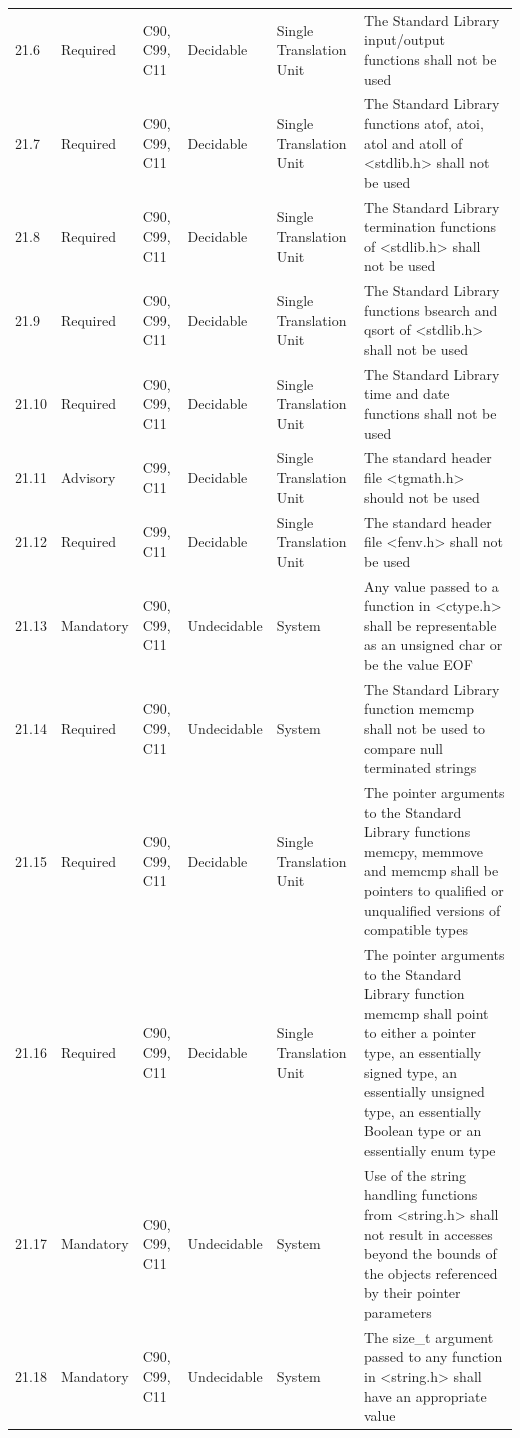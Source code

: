 \documentclass[11pt]{article}
\begin{document}
{\begin{longtable}{@{}p{1.0cm}p{1.6cm}p{1.8cm}p{2.0cm}p{1.6cm}p{7.4cm}@{}}
21.6 & Required & C90, C99, C11 & Decidable & Single Translation Unit & The Standard Library input/output functions shall not be used \\
21.7 & Required & C90, C99, C11 & Decidable & Single Translation Unit & The Standard Library functions atof, atoi, atol and atoll of <stdlib.h> shall not be used \\
21.8 & Required & C90, C99, C11 & Decidable & Single Translation Unit & The Standard Library termination functions of <stdlib.h> shall not be used \\
21.9 & Required & C90, C99, C11 & Decidable & Single Translation Unit & The Standard Library functions bsearch and qsort of <stdlib.h> shall not be used \\
21.10 & Required & C90, C99, C11 & Decidable & Single Translation Unit & The Standard Library time and date functions shall not be used \\
21.11 & Advisory & C99, C11 & Decidable & Single Translation Unit & The standard header file <tgmath.h> should not be used \\
21.12 & Required & C99, C11 & Decidable & Single Translation Unit & The standard header file <fenv.h> shall not be used \\
21.13 & Mandatory & C90, C99, C11 & Undecidable & System & Any value passed to a function in <ctype.h> shall be representable as an unsigned char or be the value EOF \\
21.14 & Required & C90, C99, C11 & Undecidable & System & The Standard Library function memcmp shall not be used to compare null terminated strings \\
21.15 & Required & C90, C99, C11 & Decidable & Single Translation Unit & The pointer arguments to the Standard Library functions memcpy, memmove and memcmp shall be pointers to qualified or unqualified versions of compatible types \\
21.16 & Required & C90, C99, C11 & Decidable & Single Translation Unit & The pointer arguments to the Standard Library function memcmp shall point to either a pointer type, an essentially signed type, an essentially unsigned type, an essentially Boolean type or an essentially enum type \\
21.17 & Mandatory & C90, C99, C11 & Undecidable & System & Use of the string handling functions from <string.h> shall not result in accesses beyond the bounds of the objects referenced by their pointer parameters \\
21.18 & Mandatory & C90, C99, C11 & Undecidable & System & The size\_t argument passed to any function in <string.h> shall have an appropriate value \\

\end{longtable}}
\end{document}
